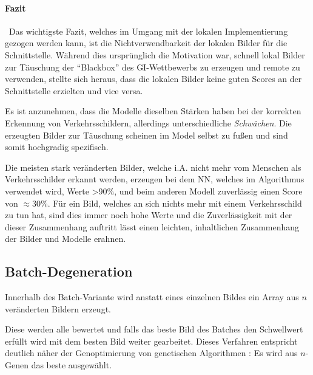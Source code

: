 \paragraph{Fazit}~\newline Das wichtigste Fazit, welches im Umgang mit der lokalen Implementierung gezogen werden kann, ist die Nichtverwendbarkeit der lokalen Bilder für die Schnittstelle. 
Während dies ursprünglich die Motivation war, schnell lokal Bilder zur Täuschung der "`Blackbox"' des \ac{GI}-Wettbewerbs zu erzeugen und remote zu verwenden, stellte sich heraus, dass die lokalen Bilder keine guten Scores an der Schnittstelle erzielten und vice versa. 

Es ist anzunehmen, dass die Modelle dieselben Stärken haben bei der korrekten Erkennung von Verkehrsschildern, allerdings unterschiedliche \textit{Schwächen}. 
Die erzeugten Bilder zur Täuschung scheinen im Model selbst zu fußen und sind somit hochgradig spezifisch. 

Die meisten stark veränderten Bilder, welche i.A. nicht mehr vom Menschen als Verkehrsschilder erkannt werden, erzeugen bei dem \ac{NN}, welches im Algorithmus verwendet wird, Werte >90\%, und beim anderen Modell zuverlässig einen Score von $\approx$30\%. 
Für ein Bild, welches an sich nichts mehr mit einem Verkehrsschild zu tun hat, sind dies immer noch hohe Werte und die Zuverlässigkeit mit der dieser Zusammenhang auftritt lässt einen leichten, inhaltlichen Zusammenhang der Bilder und Modelle erahnen.

\subsection{Batch-Degeneration}
Innerhalb des Batch-Variante wird anstatt eines einzelnen Bildes ein Array aus $n$ veränderten Bildern erzeugt. 

Diese werden alle bewertet und falls das beste Bild des Batches den Schwellwert erfüllt wird mit dem besten Bild weiter gearbeitet. 
Dieses Verfahren entspricht deutlich näher der Genoptimierung von genetischen Algorithmen \cite{gerdes2013evolutionare}: 
Es wird aus $n$-Genen das beste ausgewählt. 

